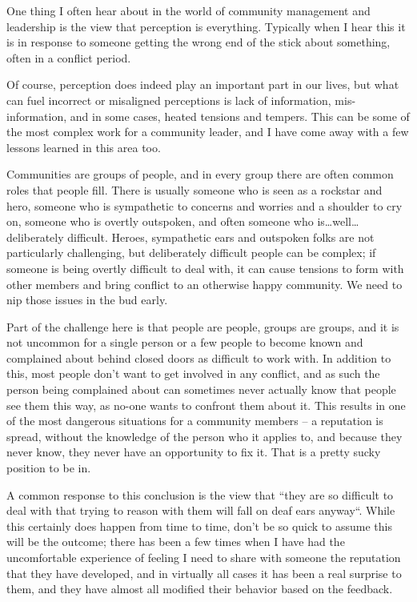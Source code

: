 One thing I often hear about in the world of community management and leadership is the view that perception is everything. Typically when I hear this it is in response to someone getting the wrong end of the stick about something, often in a conflict period.

Of course, perception does indeed play an important part in our lives, but what can fuel incorrect or misaligned perceptions is lack of information, mis-information, and in some cases, heated tensions and tempers. This can be some of the most complex work for a community leader, and I have come away with a few lessons learned in this area too.

Communities are groups of people, and in every group there are often common roles that people fill. There is usually someone who is seen as a rockstar and hero, someone who is sympathetic to concerns and worries and a shoulder to cry on, someone who is overtly outspoken, and often someone who is…well…deliberately difficult. Heroes, sympathetic ears and outspoken folks are not particularly challenging, but deliberately difficult people can be complex; if someone is being overtly difficult to deal with, it can cause tensions to form with other members and bring conflict to an otherwise happy community. We need to nip those issues in the bud early.

Part of the challenge here is that people are people, groups are groups, and it is not uncommon for a single person or a few people to become known and complained about behind closed doors as difficult to work with. In addition to this, most people don’t want to get involved in any conflict, and as such the person being complained about can sometimes never actually know that people see them this way, as no-one wants to confront them about it. This results in one of the most dangerous situations for a community members – a reputation is spread, without the knowledge of the person who it applies to, and because they never know, they never have an opportunity to fix it. That is a pretty sucky position to be in.

A common response to this conclusion is the view that “they are so difficult to deal with that trying to reason with them will fall on deaf ears anyway“. While this certainly does happen from time to time, don’t be so quick to assume this will be the outcome; there has been a few times when I have had the uncomfortable experience of feeling I need to share with someone the reputation that they have developed, and in virtually all cases it has been a real surprise to them, and they have almost all modified their behavior based on the feedback.

